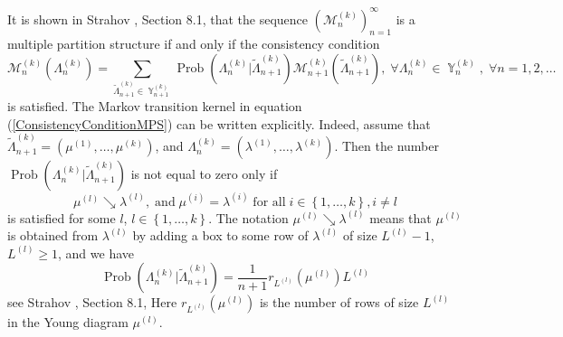 \documentclass[12pt]{amsart}
\theoremstyle{definition}
\numberwithin{equation}{section}
\DeclareMathOperator{\Prob}{Prob}
\DeclareMathOperator{\Y}{\mathbb{Y}}
\newcommand{\tLambda}{\widetilde{\Lambda}}
\begin{document}
It is shown in Strahov \cite{StrahovMPS}, Section 8.1, that the sequence
$\left(\mathcal{M}_n^{(k)}\right)_{n=1}^{\infty}$ is a multiple partition structure if and only if the consistency condition
\begin{equation}\label{ConsistencyConditionMPS}
\mathcal{M}_n^{(k)}\left(\Lambda_n^{(k)}\right)=
\sum\limits_{\tLambda_{n+1}^{(k)}\in\Y_{n+1}^{(k)}}
\Prob\left(\Lambda_n^{(k)}|\tLambda_{n+1}^{(k)}\right)\mathcal{M}_{n+1}^{(k)}\left(\tLambda_{n+1}^{(k)}\right),\;\forall\Lambda_n^{(k)}\in\Y_n^{(k)},\;\forall n=1,2,\ldots
\end{equation}
is satisfied. The Markov transition kernel in equation (\ref{ConsistencyConditionMPS}) can be written explicitly. Indeed, assume that  $\tLambda_{n+1}^{(k)}=\left(\mu^{(1)},\ldots,\mu^{(k)}\right)$, and $\Lambda_n^{(k)}=\left(\lambda^{(1)},\ldots,\lambda^{(k)}\right)$. Then the number
$\Prob\left(\Lambda_n^{(k)}|\tLambda_{n+1}^{(k)}\right)$ is not equal to zero only if
\begin{equation}\label{CTCM}
\mu^{(l)}\searrow\lambda^{(l)},\;\mbox{and}\;
\mu^{(i)}=\lambda^{(i)}\;
\mbox{for all}\; i\in\left\{1,\ldots,k\right\}, i\neq l
\end{equation}
is satisfied for some $l$, $l\in\left\{1,\ldots,k\right\}$.
The notation $\mu^{(l)}\searrow\lambda^{(l)}$ means that
$\mu^{(l)}$ is obtained from $\lambda^{(l)}$ by adding a box to some row of $\lambda^{(l)}$ of size $L^{(l)}-1$, $L^{(l)}\geq 1$, and we have
\begin{equation}
\Prob\left(\Lambda_n^{(k)}|\tLambda_{n+1}^{(k)}\right)=\frac{1}{n+1}r_{L^{(l)}}\left(\mu^{(l)}\right)L^{(l)}
\end{equation}
see Strahov \cite{StrahovMPS}, Section 8.1,
Here $r_{L^{(l)}}\left(\mu^{(l)}\right)$ is the number of rows of size $L^{(l)}$ in the Young diagram $\mu^{(l)}$.
\end{document}
